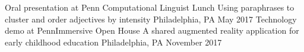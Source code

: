\begin{cventries}
  \cventrynobullet
    {Oral presentation at Penn Computational Linguist Lunch}
    {Using paraphrases to cluster and order adjectives by intensity}
    {Philadelphia, PA}
    {May 2017}
    {}
  \cventrynobullet
    {Technology demo at PennImmersive Open House}
    {A shared augmented reality application for early childhood education}
    {Philadelphia, PA}
    {November 2017}
    {}
\end{cventries}
